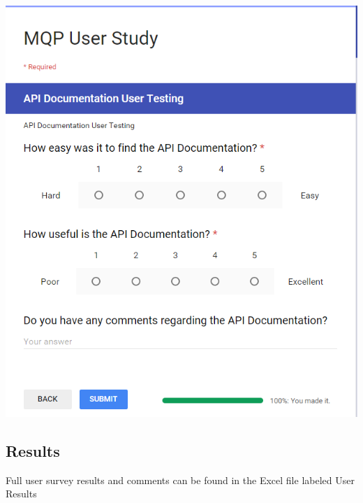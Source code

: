\begin{center}
	\includegraphics[width=0.9\linewidth]{images/survey4}
\end{center}

\subsection{Results}

Full user survey results and comments can be found in the Excel file labeled User Results